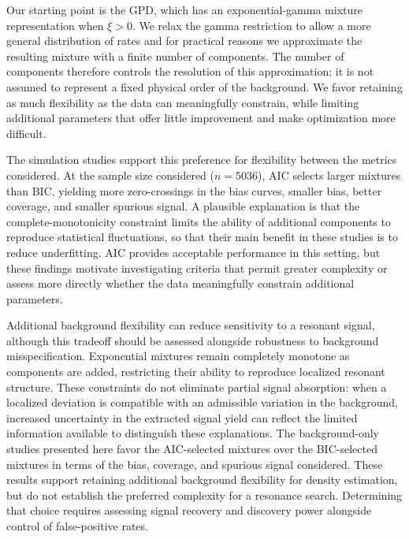 \documentclass[a4paper,11pt]{article}
\begin{document}
Our starting point is the GPD, which has an exponential-gamma mixture representation when $\xi>0$. We relax the gamma restriction to allow a more general distribution of rates and for practical reasons we approximate the resulting mixture with a finite number of components. The number of components therefore controls the resolution of this approximation; it is not assumed to represent a fixed physical order of the background. We favor retaining as much flexibility as the data can meaningfully constrain, while limiting additional parameters that offer little improvement and make optimization more difficult.

The simulation studies support this preference for flexibility between the metrics considered. At the sample size considered ($n=5036$), AIC selects larger mixtures than BIC, yielding more zero-crossings in the bias curves, smaller bias, better coverage, and smaller spurious signal. A plausible explanation is that the complete-monotonicity constraint limits the ability of additional components to reproduce statistical fluctuations, so that their main benefit in these studies is to reduce underfitting. AIC provides acceptable performance in this setting, but these findings motivate investigating criteria that permit greater complexity or assess more directly whether the data meaningfully constrain additional parameters.

Additional background flexibility can reduce sensitivity to a resonant signal, although this tradeoff should be assessed alongside robustness to background misspecification. Exponential mixtures remain completely monotone as components are added, restricting their ability to reproduce localized resonant structure. These constraints do not eliminate partial signal absorption: when a localized deviation is compatible with an admissible variation in the background, increased uncertainty in the extracted signal yield can reflect the limited information available to distinguish these explanations. The background-only studies presented here favor the AIC-selected mixtures over the BIC-selected mixtures in terms of the bias, coverage, and spurious signal considered. These results support retaining additional background flexibility for density estimation, but do not establish the preferred complexity for a resonance search. Determining that choice requires assessing signal recovery and discovery power alongside control of false-positive rates.
\end{document}
